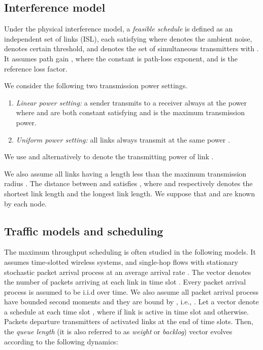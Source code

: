 \documentclass[journal]{IEEEtran}
\begin{document}
\subsection{Interference model}
 Under the physical interference model, a \emph{feasible schedule} is defined as an independent set of  links (ISL), each satisfying
{\small{}}
where  denotes the ambient noise,   denotes certain threshold, and  denotes the set of simultaneous transmitters with .  It assumes path gain , where the constant  is path-loss exponent, and  is the reference loss factor.

We consider the  following  two  transmission power settings.
\begin{enumerate}[\IEEEsetlabelwidth{12)}]
\item \emph{Linear power setting:} a sender  transmits to a receiver  always at
the power
  where  and  are both constant satisfying  and  is the maximum
transmission power.
\item \emph{Uniform power setting:} all links always transmit at the same power .
\end{enumerate}
We use  and  alternatively to denote the transmitting power of link .

We also assume all links  having a length less than the maximum transmission radius . The distance between  and  satisfies , where  and  respectively denotes the shortest link length and the longest link length. We suppose that  and   are known by each node.

\vspace*{-1\baselineskip}
\subsection{Traffic models and scheduling}
The maximum throughput scheduling is often studied in the following models. It assumes time-slotted wireless systems, and single-hop flows with stationary stochastic packet arrival process at an average arrival rate .
 The vector  denotes the number of packets arriving at each link in time slot .
Every packet arrival process  is assumed to be i.i.d over time. We also assume all packet arrival process  have bounded second moments and they are bound by , i.e., .
Let a vector   denote a schedule  at each time slot , where  if link  is active in time slot  and  otherwise. Packets departure transmitters of activated links at the end of time slots.
Then, the \emph{queue length} (it is also referred to as \emph{weight} or \emph{backlog}) vector  evolves according to the following dynamics:
\end{document}
